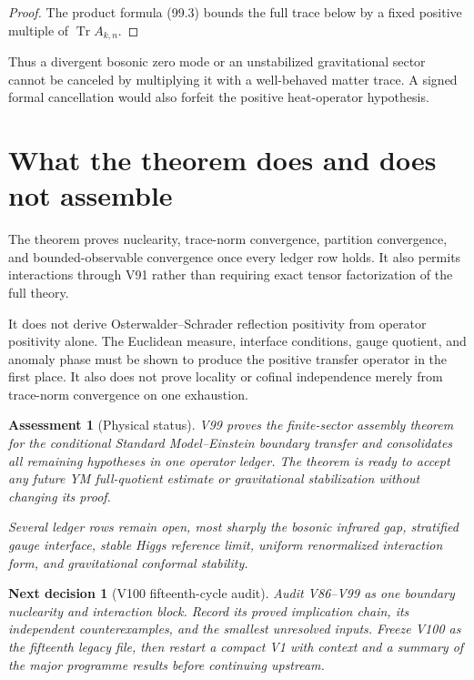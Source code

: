 \documentclass[11pt]{article}
\newtheorem{decision}[theorem]{Next decision}
\newtheorem{assessment}[theorem]{Assessment}
\theoremstyle{remark}
\begin{document}
\begin{proof}
The product formula (99.3) bounds the full trace below by a fixed
positive multiple of \(\operatorname{Tr}A_{k,n}\).
\end{proof}

Thus a divergent bosonic zero mode or an unstabilized gravitational
sector cannot be canceled by multiplying it with a well-behaved
matter trace.  A signed formal cancellation would also forfeit the
positive heat-operator hypothesis.

\section{What the theorem does and does not assemble}

The theorem proves nuclearity, trace-norm convergence, partition
convergence, and bounded-observable convergence once every ledger
row holds.  It also permits interactions through V91 rather than
requiring exact tensor factorization of the full theory.

It does not derive Osterwalder--Schrader reflection positivity from
operator positivity alone.  The Euclidean measure, interface
conditions, gauge quotient, and anomaly phase must be shown to
produce the positive transfer operator in the first place.  It also
does not prove locality or cofinal independence merely from
trace-norm convergence on one exhaustion.

\begin{assessment}[Physical status]
\label{ass:v15v99-status}
V99 proves the finite-sector assembly theorem for the conditional
Standard Model--Einstein boundary transfer and consolidates all
remaining hypotheses in one operator ledger.  The theorem is ready
to accept any future YM full-quotient estimate or gravitational
stabilization without changing its proof.

Several ledger rows remain open, most sharply the bosonic infrared
gap, stratified gauge interface, stable Higgs reference limit,
uniform renormalized interaction form, and gravitational conformal
stability.
\end{assessment}

\begin{decision}[V100 fifteenth-cycle audit]
\label{dec:v15v99-next}
Audit V86--V99 as one boundary nuclearity and interaction block.
Record its proved implication chain, its independent counterexamples,
and the smallest unresolved inputs.  Freeze V100 as the fifteenth
legacy file, then restart a compact V1 with context and a summary
of the major programme results before continuing upstream.
\end{decision}
\end{document}
